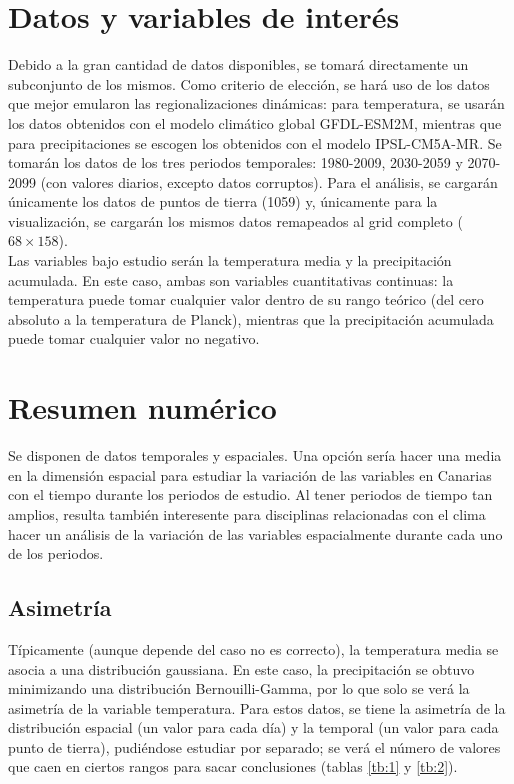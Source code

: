 \documentclass[9pt,twocolumn,twoside]{opticajnl}
\begin{document}
\section{Datos y variables de interés}

Debido a la gran cantidad de datos disponibles, se tomará directamente un subconjunto de los mismos. Como criterio de elección, se hará uso de los datos que mejor emularon las regionalizaciones dinámicas: para temperatura, se usarán los datos obtenidos con el modelo climático global GFDL-ESM2M, mientras que para precipitaciones se escogen los obtenidos con el modelo IPSL-CM5A-MR. Se tomarán los datos de los tres periodos temporales: 1980-2009, 2030-2059 y 2070-2099 (con valores diarios, excepto datos corruptos). Para el análisis, se cargarán únicamente los datos de puntos de tierra (1059) y, únicamente para la visualización, se cargarán los mismos datos remapeados al grid completo ($68 \times 158$). \\

Las variables bajo estudio serán la temperatura media y la precipitación acumulada. En este caso, ambas son variables cuantitativas continuas: la temperatura puede tomar cualquier valor dentro de su rango teórico (del cero absoluto a la temperatura de Planck), mientras que la precipitación acumulada puede tomar cualquier valor no negativo. 

\section{Resumen numérico}

Se disponen de datos temporales y espaciales. Una opción sería hacer una media en la dimensión espacial para estudiar la variación de las variables en Canarias con el tiempo durante los periodos de estudio. Al tener periodos de tiempo tan amplios, resulta también interesente para disciplinas relacionadas con el clima hacer un análisis de la variación de las variables espacialmente durante cada uno de los periodos. 

\subsection{Asimetría}

Típicamente (aunque depende del caso no es correcto), la temperatura media se asocia a una distribución gaussiana. En este caso, la precipitación se obtuvo minimizando una distribución Bernouilli-Gamma, por lo que solo se verá la asimetría de la variable temperatura. Para estos datos, se tiene la asimetría de la distribución espacial (un valor para cada día) y la temporal (un valor para cada punto de tierra), pudiéndose estudiar por separado; se verá el número de valores que caen en ciertos rangos para sacar conclusiones (tablas \ref{tb:1} y \ref{tb:2}). \\
\end{document}
